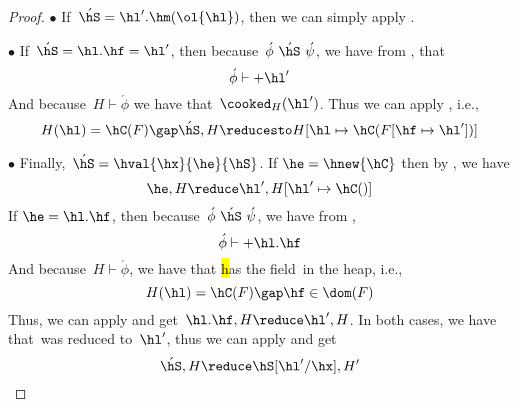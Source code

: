 \begin{proof}
$\bullet$
If~$\acute{\hS} = \hl'.\hm(\ol{\hl})$, then we can simply apply .

$\bullet$
If~$\acute{\hS} = \hl.\hf=\hl'$, then because~$\acute{\phi}~\acute{\hS}~\acute{\psi}$, we have from , that \[
\acute{\phi} \vdash +\hl'
\]
And because~$H \vdash \acute{\phi}$ we have that~$\cooked_H(\hl')$.
Thus we can apply , i.e., \[
    H(\hl)=\hC(F) \gap
    \acute{\hS},H \reducesto H[ \hl \mapsto \hC(F[ \hf \mapsto \hl'])]
\]

$\bullet$
Finally,~$\acute{\hS} = \hval{\hx}{\he}{\hS}$.
If $\he = \hnew{\hC}$ then by , we have \[
    \he,H \reduce \hl',H[ \hl' \mapsto \hC()]
\]
If $\he = \hl.\hf$, then because~$\acute{\phi}~\acute{\hS}~\acute{\psi}$, we have from , \[
    \acute{\phi} \vdash +\hl.\hf
\]
And because~$H \vdash \acute{\phi}$, we have that \hl has the field~\hf in the heap, i.e., \[
    H(\hl)=\hC(F) \gap \hf \in \dom(F)
\]
Thus, we can apply  and get~$\hl.\hf,H \reduce \hl',H$.
In both cases, we have that~\he was reduced to~$\hl'$, thus we can apply  and get \[
    \acute{\hS},H \reduce \hS[\hl'/\hx], H'
\]
\end{proof}
